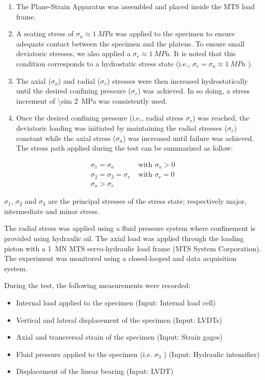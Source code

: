 \begin{enumerate}
    \item The Plane-Strain Apparatus was assembled and placed inside the MTS load frame.

    \item  A seating stress of $\sigma_a \approx \SI{1}{MPa}$ was applied to the specimen to ensure adequate contact between the specimen and the platens. To ensure small deviatoric stresses, we also applied a $\sigma_r \approx \SI{1}{MPa}$. It is noted that this condition corresponds to a hydrostatic stress state (i.e., $\sigma_r = \sigma_a \approx \SI{1}{MPa}$ ).

    \item  The axial ($\sigma_a$) and radial ($\sigma_r$) stresses were then increased hydrostatically until the desired confining pressure ($\sigma_r$) was achieved. In so doing, a stress increment of \SI{\sim 2}{MPa} was consistently used.

    \item  Once the desired confining pressure (i.e., radial stress $\sigma_r$) was reached, the deviatoric loading was initiated by maintaining the radial stresses ($\sigma_r$) constant while the axial stress ($\sigma_a$) was increased until failure was achieved. The stress path applied during the test can be summarized as follow:
\end{enumerate}

\begin{align}
    \sigma_1 = \sigma_a &\text{ with } \sigma_a > 0 \\
    \sigma_2 = \sigma_3 = \sigma_r  &\text{ with } \sigma_r = 0 \\
    \sigma_a > \sigma_r
\end{align}

$\sigma_1$, $\sigma_2$  and  $\sigma_3$  are the principal stresses of the stress state; respectively major, intermediate and minor stress.

The radial stress was applied using a fluid pressure system where confinement is provided using hydraulic oil. The axial load was applied through the loading piston with a \SI{1}{MN} MTS servo-hydraulic load frame (MTS System Corporation). The experiment was monitored using a closed-looped and data acquisition system. 

During the test, the following measurements were recorded: 

\begin{itemize}
    \item Internal load applied to the specimen (Input: Internal load cell)
    \item Vertical and lateral displacement of the specimen (Input: LVDTs)
    \item Axial and transversal strain of the specimen (Input: Strain gages)
    \item Fluid pressure applied to the specimen (i.e. $\sigma_3$ ) (Input: Hydraulic intensifier) 
    \item Displacement of the linear bearing (Input: LVDT)
\end{itemize}

